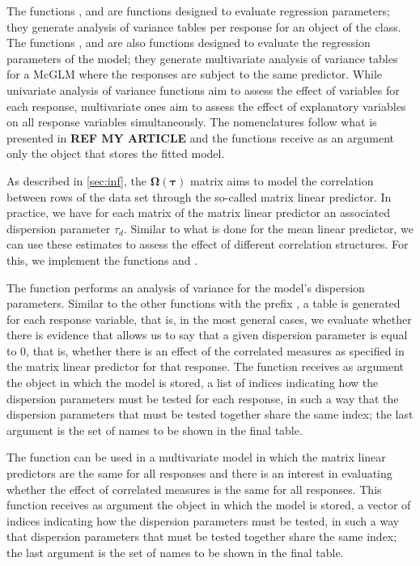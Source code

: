 \documentclass[article]{jss}\usepackage[]{graphicx}\usepackage[]{xcolor}
\begin{document}
The functions ,  and  are functions designed to evaluate regression parameters; they generate analysis of variance tables per response for an object of the  class. The functions ,  and  are also functions designed to evaluate the regression parameters of the model; they generate multivariate analysis of variance tables for a McGLM where the responses are subject to the same predictor. While univariate analysis of variance functions aim to assess the effect of variables for each response, multivariate ones aim to assess the effect of explanatory variables on all response variables simultaneously. The nomenclatures follow what is presented in \textbf{REF MY ARTICLE} and the functions receive as an argument only the object that stores the fitted model.

As described in \autoref{sec:inf}, the $\boldsymbol{\Omega({\tau})}$ matrix aims to model the correlation between rows of the data set through the so-called matrix linear predictor. In practice, we have for each matrix of the matrix linear predictor an associated dispersion parameter $\tau_d$. Similar to what is done for the mean linear predictor, we can use these estimates to assess the effect of different correlation structures. For this, we implement the functions  and .

The  function performs an analysis of variance for the model's dispersion parameters. Similar to the other functions with the prefix , a table is generated for each response variable, that is, in the most general cases, we evaluate whether there is evidence that allows us to say that a given dispersion parameter is equal to 0, that is, whether there is an effect of the correlated measures as specified in the matrix linear predictor for that response. The function receives as argument the object in which the model is stored, a list of indices indicating how the dispersion parameters must be tested for each response, in such a way that the dispersion parameters that must be tested together share the same index; the last argument is the set of names to be shown in the final table.

The  function can be used in a multivariate model in which the matrix linear predictors are the same for all responses and there is an interest in evaluating whether the effect of correlated measures is the same for all responses. This function receives as argument the object in which the model is stored, a vector of indices indicating how the dispersion parameters must be tested, in such a way that dispersion parameters that must be tested together share the same index; the last argument is the set of names to be shown in the final table.
\end{document}
